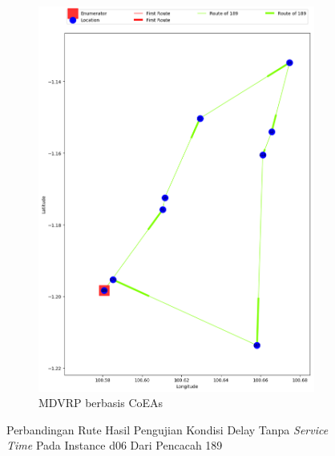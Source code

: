 \begin{figure}[H]
	\centering
	\begin{subfigure}[t]{\textwidth}
		\centering
		\includegraphics[width=\textwidth]{Resources/Images/delayed_6/real_m15_n100_delayed_6_189_coes}
		\caption{MDVRP berbasis CoEAs}
		\label{fig:real_m15_n100_delayed_6_189_coes}
	\end{subfigure}
	\caption{Perbandingan Rute Hasil Pengujian Kondisi Delay Tanpa \textit{Service Time} Pada Instance d06 Dari Pencacah 189}
	\label{fig:real_m15_n100_delayed_6_189}
\end{figure}


